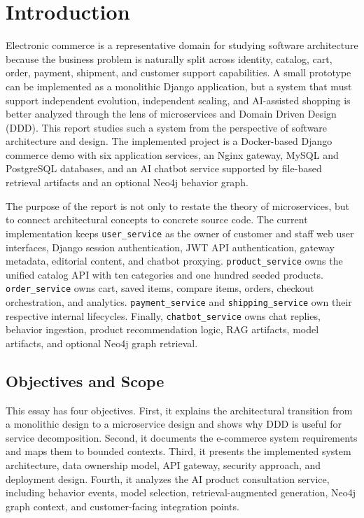 \documentclass[12pt,a4paper]{article}
\begin{document}
\tableofcontents
\newpage
\listoffigures
\listoftables
\newpage

\section{Introduction}

Electronic commerce is a representative domain for studying software architecture because the business problem is naturally split across identity, catalog, cart, order, payment, shipment, and customer support capabilities. A small prototype can be implemented as a monolithic Django application, but a system that must support independent evolution, independent scaling, and AI-assisted shopping is better analyzed through the lens of microservices and Domain Driven Design (DDD). This report studies such a system from the perspective of software architecture and design. The implemented project is a Docker-based Django commerce demo with six application services, an Nginx gateway, MySQL and PostgreSQL databases, and an AI chatbot service supported by file-based retrieval artifacts and an optional Neo4j behavior graph.

The purpose of the report is not only to restate the theory of microservices, but to connect architectural concepts to concrete source code. The current implementation keeps \texttt{user\_service} as the owner of customer and staff web user interfaces, Django session authentication, JWT API authentication, gateway metadata, editorial content, and chatbot proxying. \texttt{product\_service} owns the unified catalog API with ten categories and one hundred seeded products. \texttt{order\_service} owns cart, saved items, compare items, orders, checkout orchestration, and analytics. \texttt{payment\_service} and \texttt{shipping\_service} own their respective internal lifecycles. Finally, \texttt{chatbot\_service} owns chat replies, behavior ingestion, product recommendation logic, RAG artifacts, model artifacts, and optional Neo4j graph retrieval.

\subsection{Objectives and Scope}

This essay has four objectives. First, it explains the architectural transition from a monolithic design to a microservice design and shows why DDD is useful for service decomposition. Second, it documents the e-commerce system requirements and maps them to bounded contexts. Third, it presents the implemented system architecture, data ownership model, API gateway, security approach, and deployment design. Fourth, it analyzes the AI product consultation service, including behavior events, model selection, retrieval-augmented generation, Neo4j graph context, and customer-facing integration points.
\end{document}
